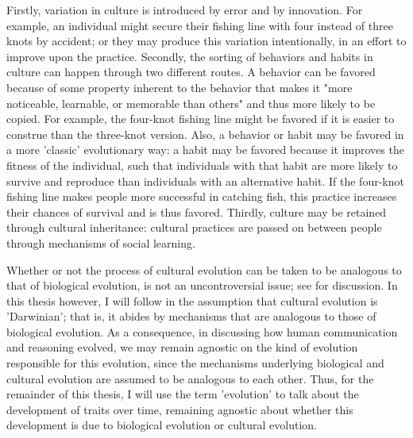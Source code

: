 Firstly, variation in culture is introduced by error and by innovation. For example, an individual might secure their fishing line with four instead of three knots by accident; or they may produce this variation intentionally, in an effort to improve upon the practice.
Secondly, the sorting of behaviors and habits in culture can happen through two different routes. A behavior can be favored because of some property inherent to the behavior that makes it "more noticeable, learnable, or memorable than others" \citep[p.~34]{Heyes18} and thus more likely to be copied. For example, the four-knot fishing line might be favored if it is easier to construe than the three-knot version.
Also, a behavior or habit may be favored in a more 'classic' evolutionary way: a habit may be favored because it improves the fitness of the individual, such that individuals with that habit are more likely to survive and reproduce than individuals with an alternative habit. If the four-knot fishing line makes people more successful in catching fish, this practice increases their chances of survival and is thus favored.
Thirdly, culture may be retained through cultural inheritance: cultural practices are passed on between people through mechanisms of social learning.

Whether or not the process of cultural evolution can be taken to be analogous to that of biological evolution, is not an uncontroversial issue; see \citet{Claidiere14, Stanley21} for discussion.
In this thesis however, I will follow \citet{Heyes18} in the assumption that cultural evolution is 'Darwinian'; that is, it abides by mechanisms that are analogous to those of biological evolution.
As a consequence, in discussing how human communication and reasoning evolved, we may remain agnostic on the kind of evolution responsible for this evolution, since the mechanisms underlying biological and cultural evolution are assumed to be analogous to each other.
Thus, for the remainder of this thesis, I will use the term 'evolution' to talk about the development of traits over time, remaining agnostic about whether this development is due to biological evolution or cultural evolution.

